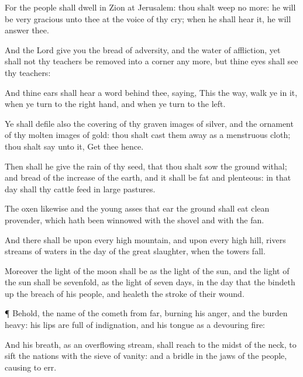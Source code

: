 {For the
people shall
dwell in
Zion at
Jerusalem: thou shalt
weep no
more: he will be
very
gracious unto thee at the
voice of thy
cry; when he shall
hear it, he will
answer thee.

And
{} the
Lord
give you the
bread of
adversity, and the
water of
affliction, yet shall not thy
teachers be removed into a
corner any more, but thine
eyes shall
see thy
teachers:

And thine
ears shall
hear a
word
behind thee,
saying, This
{} the
way, walk ye in
it, when ye turn to the right
hand, and when ye turn to the
left.

Ye shall
defile also the
covering of thy graven
images of
silver, and the
ornament of thy molten
images of
gold: thou shalt cast them
away as a menstruous
cloth; thou shalt
say unto it, Get thee
hence.

Then shall he
give the
rain of thy
seed, that thou shalt
sow the
ground withal; and
bread of the
increase of the
earth, and it shall be
fat and
plenteous: in that
day shall thy
cattle
feed in
large
pastures.

The
oxen likewise and the young
asses that
ear the
ground shall
eat
clean
provender, which hath been
winnowed with the
shovel and with the
fan.

And there shall be upon every
high
mountain, and upon every
high
hill,
rivers
{}
streams of
waters in the
day of the
great
slaughter, when the
towers
fall.

Moreover the
light of the
moon shall be as the
light of the
sun, and the
light of the
sun shall be
sevenfold, as the
light of
seven
days, in the
day that the
{} bindeth
up the
breach of his
people, and
healeth the
stroke of their
wound.


\par }{\PP {}¶ Behold, the
name of the
{}
cometh from
far,
burning
{} his
anger, and the
burden
{}
heavy: his
lips are
full of
indignation, and his
tongue as a
devouring
fire:

And his
breath, as an
overflowing
stream, shall reach to the
midst of the
neck, to
sift the
nations with the
sieve of
vanity: and
{} a
bridle in the
jaws of the
people, causing
{} to
err.

}
